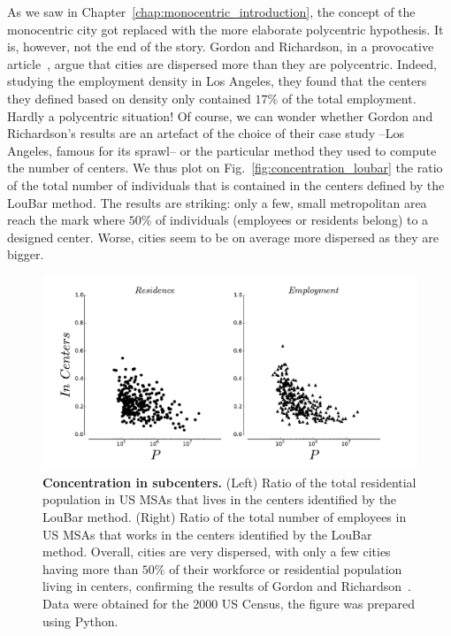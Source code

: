 As we saw in Chapter~\ref{chap:monocentric_introduction}, the concept of the
monocentric city got replaced with the more elaborate polycentric hypothesis. It
is, however, not the end of the story. Gordon and Richardson, in a
provocative article~\cite{Gordon:1996}, argue that cities are dispersed more
than they are polycentric. Indeed, studying the employment density in Los Angeles,
they found that the centers they defined based on density only contained $17\%$
of the total employment. Hardly a polycentric situation!  Of course, we can
wonder whether Gordon and Richardson's results are an artefact of the choice of
their case study --Los Angeles, famous for its sprawl-- or the particular method
they used to compute the number of centers. We thus plot on
Fig.~\ref{fig:concentration_loubar} the ratio of the total number of individuals
that is contained in the centers defined by the LouBar method. The results are
striking: only a few, small metropolitan area reach the mark where $50\%$ of
individuals (employees or residents belong) to a designed center. Worse, cities
seem to be on average more dispersed as they are bigger.\\

\begin{figure}
    \centering
    \includegraphics[width=1\textwidth]{gfx/chapter-monocentric/concentration_loubar.pdf}
    \caption{{\bf Concentration in subcenters.} (Left) Ratio of the total
    residential population in US MSAs that lives in the centers identified by the LouBar
method. (Right) Ratio of the total number of employees in US MSAs that works in the centers
identified by the LouBar method. Overall, cities are very dispersed, with only a
few cities having more than $50\%$ of their workforce or residential population
living in centers, confirming the results of Gordon and
Richardson~\cite{Gordon:1996}. Data were obtained for the 2000 US Census, the
figure was prepared using Python.\label{fig:concentation_loubar}}
\end{figure}

